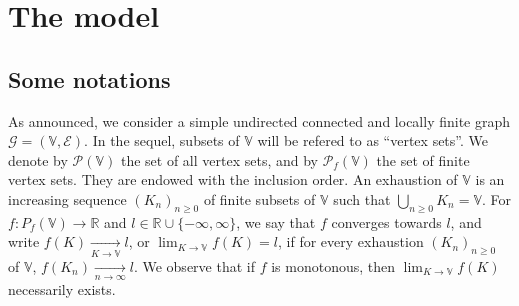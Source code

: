 \documentclass[12pt,a4paper]{article}
\newcommand{\1}[1]{{\mathbf 1}{\{#1\}}}
\newcommand{\R}{{\mathbb R}}
\newcommand{\8}{{\infty}}
\begin{document}


\section{The model}


\subsection{Some notations}


As announced, we consider a simple undirected connected and locally finite graph $\mathcal{G}=(\mathbb{V}, \mathcal{E})$. In the sequel, subsets of $\mathbb{V}$ will be refered to as ``vertex sets''. 
We denote by $\mathcal{P}(\mathbb{V})$ the set of all vertex sets, and by $\mathcal{P}_f(\mathbb{V})$ the set of finite vertex sets. They are endowed with the inclusion order. %
An exhaustion of $\mathbb{V}$ is an increasing sequence $(K_n)_{n\ge 0}$ of finite subsets of $\mathbb{V}$ such that $\bigcup_{n\ge 0} K_n =\mathbb{V}$. 
For $f: P_f(\mathbb{V})\to \R$ and $l\in \R \cup\{-\infty, \infty\}$, 
we say that $f$ converges towards $l$, 
and write $f(K)\underset{K\to\mathbb{V}}\longrightarrow l$, or $\lim_{K\to \mathbb{V}} f(K) = l $,
if for every exhaustion $(K_n)_{n\ge 0}$ of $\mathbb{V}$, $f(K_n)\underset{n \to\infty}\longrightarrow l$. 
We observe that if $f$ is monotonous, then $\lim_{K\to \mathbb{V}} f(K)$ necessarily exists.



\medskip
\end{document}
